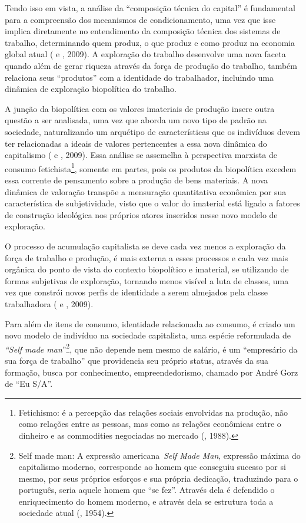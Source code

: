 Tendo isso em vista, a análise da ``composição técnica do capital'' é
fundamental para a compreensão dos mecanismos de condicionamento, uma
vez que isse implica diretamente no entendimento da composição técnica
dos sistemas de trabalho, determinando quem produz, o que produz e como
produz na economia global atual ( e , 2009). A exploração do
trabalho desenvolve uma nova faceta quando além de gerar riqueza através
da força de produção do trabalho, também relaciona seus ``produtos'' com
a identidade do trabalhador, incluindo uma dinâmica de exploração
biopolítica do trabalho.

A junção da biopolítica com os valores imateriais de produção insere
outra questão a ser analisada, uma vez que aborda um novo tipo de padrão
na sociedade, naturalizando um arquétipo de características que os
indivíduos devem ter relacionadas a ideais de valores pertencentes a
essa nova dinâmica do capitalismo ( e , 2009). Essa análise
se assemelha à perspectiva marxista de consumo fetichista\footnote{Fetichismo:
  é a percepção das relações sociais envolvidas na produção, não como
  relações entre as pessoas, mas como as relações econômicas entre o
  dinheiro e as commodities negociadas no mercado (, 1988).},
somente em partes, pois os produtos da biopolítica excedem essa corrente
de pensamento sobre a produção de bens materiais. A nova dinâmica de
valoração transpõe a mensuração quantitativa econômica por sua
característica de subjetividade, visto que o valor do imaterial está
ligado a fatores de construção ideológica nos próprios atores inseridos
nesse novo modelo de exploração.

O processo de acumulação capitalista se deve cada vez menos a exploração
da força de trabalho e produção, é mais externa a esses processos e cada
vez mais orgânica do ponto de vista do contexto biopolítico e imaterial,
se utilizando de formas subjetivas de exploração, tornando menos visível
a luta de classes, uma vez que constrói novos perfis de identidade a
serem almejados pela classe trabalhadora ( e , 2009).

Para além de itens de consumo, identidade relacionada ao consumo, é
criado um novo modelo de indivíduo na sociedade capitalista, uma espécie
reformulada de \emph{``Self made man}''\footnote{Self made man: A
  expressão americana~\emph{Self Made Man}, expressão máxima do
  capitalismo moderno, corresponde ao homem que conseguiu sucesso por si
  mesmo, por seus próprios esforços e sua própria dedicação, traduzindo
  para o português, seria aquele homem que ``se fez''. Através dela é
  defendido o enriquecimento do homem moderno, e através dela se
  estrutura toda a sociedade atual (, 1954).}, que não
depende nem mesmo de salário, é um ``empresário da sua força de
trabalho'' que providencia seu próprio status, através da sua formação,
busca por conhecimento, empreendedorismo, chamado por André Gorz de ``Eu
S/A''.

